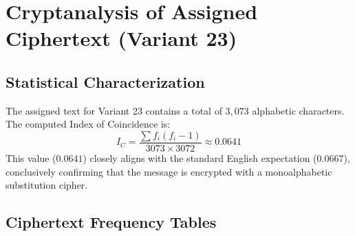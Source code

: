 \documentclass[12pt,a4paper]{article}
\begin{document}
\section{Cryptanalysis of Assigned Ciphertext (Variant 23)}

\subsection{Statistical Characterization}
The assigned text for Variant 23 contains a total of $3,073$ alphabetic characters. The computed Index of Coincidence is:
\begin{equation}
    I_C = \frac{\sum f_i(f_i - 1)}{3073 \times 3072} \approx 0.0641
\end{equation}
This value ($0.0641$) closely aligns with the standard English expectation ($0.0667$), conclusively confirming that the message is encrypted with a monoalphabetic substitution cipher.

\subsection{Ciphertext Frequency Tables}
\end{document}
